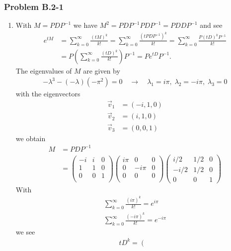 \documentclass[10pt,a4paper]{article}
\theoremstyle{definition}
\begin{document}
\subsubsection{Problem B.2-1}
\begin{enumerate}
\item
With $M=PDP^{-1}$ we have $M^2=PDP^{-1}PDP^{-1}=PDDP^{-1}$ and see
\begin{align}
    e^{tM}&=\sum_{k=0}^\infty \frac{(tM)^k}{k!}=\sum_{k=0}^\infty \frac{(tPDP^{-1})^k}{k!}=\sum_{k=0}^\infty \frac{P(tD)^kP^{-1}}{k!}\\
    &=P\left(\sum_{k=0}^\infty \frac{(tD)^k}{k!}\right)P^{-1}=Pe^{tD}P^{-1}.
\end{align}
The eigenvalues of $M$ are given by
\begin{align}
    -\lambda^3-(-\lambda)(-\pi^2)=0\quad\rightarrow\quad\lambda_1=i\pi,\;\lambda_2=-i\pi,\;\lambda_3= 0
\end{align}
with the eigenvectors
\begin{align}
    \vec{v}_1&=(-i,1,0)\\
    \vec{v}_2&=(i,1,0)\\
    \vec{v}_3&=(0,0,1)
\end{align}
we obtain
\begin{align}
M&=PDP^{-1}\\
&=\left(
\begin{array}{ccc}
-i& i & 0 \\
1 & 1 & 0 \\
0 & 0 & 1 \\
\end{array}
\right)
\left(
\begin{array}{ccc}
 i\pi & 0 & 0 \\
 0 & -i\pi & 0 \\
 0 & 0 & 0 \\
\end{array}
\right)
\left(
\begin{array}{ccc}
  i/2 & 1/2 & 0 \\
 -i/2 & 1/2 & 0 \\
 0    & 0   & 1
\end{array}
\right)
\end{align}
With
\begin{align}
\sum_{k=0}^\infty \frac{(i\pi)^k}{k!}=e^{i\pi}\\
\sum_{k=0}^\infty \frac{(-i\pi)^k}{k!}=e^{-i\pi}
\end{align}
we see
\begin{align}
 tD^k=\left(
\begin{array}{ccc}

\end{array}
\end{align}
\end{enumerate}
\end{document}

